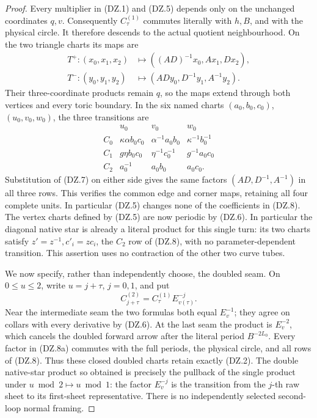 \begin{proof}
Every multiplier in (DZ.1) and (DZ.5) depends only on the unchanged
coordinates \(q,v\). Consequently \(C^{(1)}_\tau\) commutes literally
with \(h,B\), and with the physical circle. It therefore descends
to the actual quotient neighbourhood. On the two triangle charts its
maps are
\[
 \begin{split}
 T^+:(x_0,x_1,x_2)&\longmapsto
       ((AD)^{-1}x_0,Ax_1,Dx_2),\\
 T^-:(y_0,y_1,y_2)&\longmapsto
       (ADy_0,D^{-1}y_1,A^{-1}y_2).
 \end{split}                                          \tag{DZ.7}
\]
Their three-coordinate products remain \(q\), so the maps extend
through both vertices and every toric boundary. In the six named
charts \((a_0,b_0,c_0)\), \((u_0,v_0,w_0)\), the three transitions are
\[
 \begin{array}{c|ccc}
 &u_0&v_0&w_0\\ \hline
 C_0&\kappa\alpha b_0c_0&\alpha^{-1}a_0b_0&
                                      \kappa^{-1}b_0^{-1}\\
 C_1&g\eta b_0c_0&\eta^{-1}c_0^{-1}&g^{-1}a_0c_0\\
 C_2&a_0^{-1}&a_0b_0&a_0c_0 .
 \end{array}                                          \tag{DZ.8}
\]
Substitution of (DZ.7) on either side gives the same factors
\((AD,D^{-1},A^{-1})\) in all three rows. This verifies the common
edge and corner maps, retaining all four complete units. In
particular (DZ.5) changes none of the coefficients in (DZ.8).
The vertex charts defined by (DZ.5) are now periodic by (DZ.6).
In particular the diagonal native star is already a literal product
for this single turn: its two charts satisfy
\(z'=z^{-1},c'_i=zc_i\), the \(C_2\) row of (DZ.8), with no
parameter-dependent transition. This assertion uses no
contraction of the other two curve tubes.

We now specify, rather than independently choose, the doubled
seam. On \(0\leq u\leq2\), write \(u=j+\tau\), \(j=0,1\), and put
\[
              C^{(2)}_{j+\tau}
                    =C^{(1)}_\tau E_{v(\tau)}^{-j}. \tag{DZ.8a}
\]
Near the intermediate seam the two formulas both equal \(E_v^{-1}\);
they agree on collars with every derivative by (DZ.6). At the last
seam the product is \(E_v^{-2}\), which cancels the doubled
forward arrow after the literal period \(B^{-2L_0}\).
Every factor in (DZ.8a) commutes with the full periods, the physical
circle, and all rows of (DZ.8). Thus these closed doubled charts
retain exactly (DZ.2). The double native-star product so obtained
is precisely the pullback of the single product under
\(u\bmod2\mapsto u\bmod1\): the factor \(E_v^{-j}\) is the
transition from the \(j\)-th raw sheet to its first-sheet
representative. There is no independently selected second-loop
normal framing.


\end{proof}
